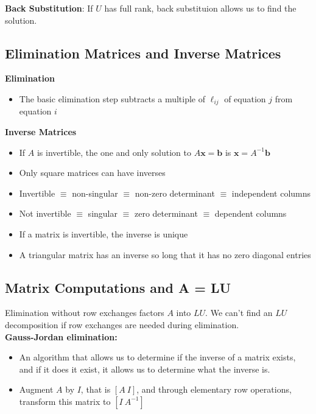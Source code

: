 \documentclass[11pt]{article}
\begin{document}
\textbf{Back Substitution}:
If $U$ has full rank, back substituion allows us to find the solution. \\

\subsection{Elimination Matrices and Inverse Matrices}

\textbf{Elimination}

\begin{itemize}
    \item The basic elimination step subtracts a multiple of $\ell_{ij}$ of equation $j$ from
    equation $i$
\end{itemize}

\textbf{Inverse Matrices}

\begin{itemize}
    \item If $A$ is invertible, the one and only solution to $A\boldsymbol{x} = \boldsymbol{b}$
    is $\boldsymbol{x} = A^{-1}\boldsymbol{b}$
    \item Only square matrices can have inverses
    \item Invertible $\equiv$ non-singular $\equiv$ non-zero determinant $\equiv$ independent 
    columns
    \item Not invertible $\equiv$ singular $\equiv$ zero determinant $\equiv$ dependent columns
    \item If a matrix is invertible, the inverse is unique
    \item A triangular matrix has an inverse so long that it has no zero diagonal entries
\end{itemize}

\subsection{Matrix Computations and A = LU}

Elimination without row exchanges factors $A$ into $LU$. We can't find an $LU$ decomposition if 
row exchanges are needed during elimination. \\

\textbf{Gauss-Jordan elimination:}
\begin{itemize}
    \item An algorithm that allows us to determine if the inverse of a matrix exists, and if it
    does it exist, it allows us to determine what the inverse is. 
    \item Augment $A$ by $I$, that is $ \left[ A \ I \right]$, and through elementary row 
    operations, transform this matrix to $ \left[ I \ A^{-1} \right]$
\end{itemize}
\end{document}
